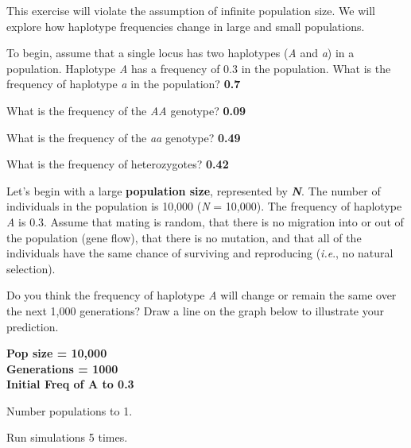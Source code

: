 \documentclass[11pt, addpoints, hidelinks]{exam}
\begin{document}
This exercise will violate the assumption of infinite population size.
We will explore how haplotype frequencies change in large and small
populations.


\begin{questions}
\question[1]
To begin, assume that a single locus has two haplotypes (\emph{A} and
\emph{a}) in a population. Haplotype \emph{A} has a
frequency of 0.3 in the population. What is the frequency of haplotype
\emph{a} in the population? \ifprintanswers \textbf{0.7} \fi

\vspace{1cm}

\question[1]
What is the frequency of the \emph{AA} genotype? \ifprintanswers \textbf{0.09} \fi

\vspace{1cm}

\question[1]
What is the frequency of the \emph{aa} genotype? \ifprintanswers \textbf{0.49} \fi

\vspace{1cm}

\question[1]
What is the frequency of heterozygotes? \ifprintanswers \textbf{0.42} \fi

\vspace{1cm}


Let's begin with a large \textbf{population size}, represented by
\textbf{\textit{N}}. The number of individuals in the population is 10,000
(\emph{N} = 10,000). The frequency of haplotype \emph{A} is 0.3. Assume
that mating is random, that there is no migration into or out of the
population (gene flow), that there is no mutation, and that all of the
individuals have the same chance of surviving and reproducing
(\emph{i.e}., no natural selection).


\question
Do you think the frequency of haplotype \emph{A} will change
or remain the same over the next 1,000 generations? Draw a line on the
graph below to illustrate your prediction.

\begin{minipage}[l][3.5in]{\textwidth}


\ifprintanswers

\bigskip

{\Large \bfseries Pop size = 10,000\\
Generations = 1000
\\
Initial Freq of A to 0.3 \bigskip

Number populations to 1.
\bigskip

Run simulations 5 times.
}


\end{minipage}
\end{questions}
\end{document}
